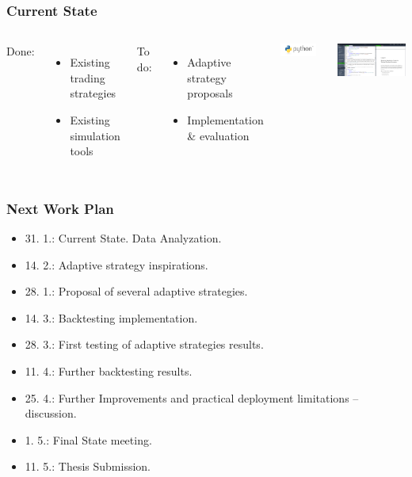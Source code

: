 \begin{frame}
  \frametitle{Current State}
  \begin{columns}
    Done:
    \begin{itemize}
      \item Existing trading strategies
      \item Existing simulation tools
    \end{itemize}
    \bigskip
    To do:
    \begin{itemize}
      \item Adaptive strategy proposals
      \item Implementation \& evaluation
    \end{itemize}
    
    \centering
    \includegraphics[width=0.9\textwidth]{img/python.png}
    
    \bigskip
    \includegraphics[width=\textwidth]{img/overleaf.png}
    
  \end{columns}
\end{frame}


\begin{frame}
  \frametitle{Next Work Plan}
  \begin{itemize}
    \item 31. 1.: Current State. Data Analyzation.
    \item 14. 2.: Adaptive strategy inspirations.
    \item 28. 1.: Proposal of several adaptive strategies.
    \item 14. 3.: Backtesting implementation.
    \item 28. 3.: First testing of adaptive strategies results.
    \item 11. 4.: Further backtesting results.
    \item 25. 4.: Further Improvements and practical deployment limitations -- discussion.
    \item 1. 5.: Final State meeting.
    \item 11. 5.: Thesis Submission.
  \end{itemize}
\end{frame}


